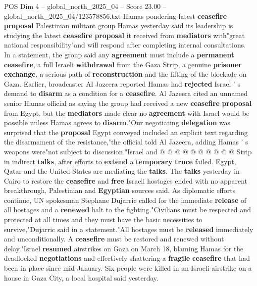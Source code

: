 \begin{textsample}{POS Dim 4 – global\_north\_2025\_04 – Score 23.00 – global\_north\_2025\_04/123578856.txt}  \label{ex:f4_pos_218}
Hamas pondering latest \textbf{ceasefire} \textbf{proposal} Palestinian militant group Hamas yesterday said its leadership is studying the latest \textbf{ceasefire} \textbf{proposal} it received from \textbf{mediators} with"great national responsibility"and will respond after completing internal consultations.
In a statement, the group said any \textbf{agreement} must include a \textbf{permanent} \textbf{ceasefire}, a full Israeli \textbf{withdrawal} from the Gaza Strip, a genuine \textbf{prisoner} \textbf{exchange}, a serious path of \textbf{reconstruction} and the lifting of the blockade on Gaza.
Earlier, broadcaster Al Jazeera reported Hamas had \textbf{rejected} Israel ' s demand to \textbf{disarm} as a condition for a \textbf{ceasefire}.
Al Jazeera cited an unnamed senior Hamas official as saying the group had received a new \textbf{ceasefire} \textbf{proposal} from Egypt, but the \textbf{mediators} made clear no \textbf{agreement} with Israel would be possible unless Hamas agrees to \textbf{disarm}."Our negotiating \textbf{delegation} was surprised that the \textbf{proposal} Egypt conveyed included an explicit text regarding the disarmament of the resistance,"the official told Al Jazeera, adding Hamas ' s weapons were"not subject to discussion."Israel and @ @ @ @ @ @ @ @ @ @ Strip in indirect \textbf{talks}, after efforts to \textbf{extend} a \textbf{temporary} \textbf{truce} failed.
Egypt, Qatar and the United States are mediating the \textbf{talks}.
The \textbf{talks} yesterday in Cairo to restore the \textbf{ceasefire} and \textbf{free} Israeli hostages ended with no apparent breakthrough, Palestinian and \textbf{Egyptian} sources said.
As diplomatic efforts continue, UN spokesman Stephane Dujarric called for the immediate \textbf{release} of all hostages and a \textbf{renewed} halt to the fighting."Civilians must be respected and protected at all times and they must have the basic necessities to survive,"Dujarric said in a statement."All hostages must be \textbf{released} immediately and unconditionally.
A \textbf{ceasefire} must be restored and renewed without delay."Israel \textbf{resumed} airstrikes on Gaza on March 18, blaming Hamas for the deadlocked \textbf{negotiations} and effectively shattering a \textbf{fragile} \textbf{ceasefire} that had been in place since mid-January.
Six people were killed in an Israeli airstrike on a house in Gaza City, a local hospital said yesterday.

\end{textsample}
